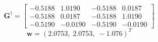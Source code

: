 \begin{enumerate}
\begin{solution}
    \begin{equation*}
      \mathbf{G}^\dagger=
      \left[
        \begin{array}{rrrr}
          -0.5188 & 1.0190 & -0.5188 &0.0187\\
          -0.5188 & 0.0187 & -0.5188 &1.0190\\
          -0.5190 & -0.0190 & -0.5190 &-0.0190
        \end{array}\right]
    \end{equation*}
    \begin{equation*}
      \mathbf{w}=(2.0753,\;2.0753,\;-1.076)^T
    \end{equation*}


  \end{solution}
  


  
  



  
  
\end{enumerate}

